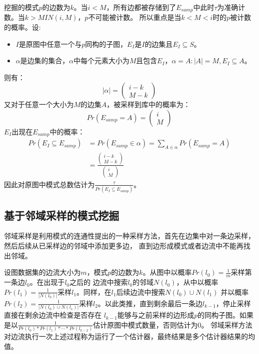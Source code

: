 \documentclass[master]{thesis-uestc}
\begin{document}
    挖掘的模式$p$的边数为$k$。当$i<M$，所有边都被存储到了$E_{samp}$中此时$\tau$为准确计数。当$k>MIN(i,M)$，$p$不可能被计数。
所以重点是当$k<M<i$时的$p$被计数的概率。设:
\begin{itemize}
    \item $I$是原图中任意一个与$p$同构的子图，$E_I$是$I$的边集且$E_I \subseteq S$。
    \item $\alpha$是边集的集合，$\alpha$中每个元素大小为$M$且包含$E_I$，$\alpha={A: |A| = M , E_I \subseteq A}$。
\end{itemize}
则有：
\begin{equation*}
    |\alpha|=\left(\begin{array}{c}
        i-k\\
        M-k
    \end{array}\right)
\end{equation*}
又对于任意一个大小为$M$的边集$A$，被采样到库中的概率为：
\begin{equation*}
    Pr(E_{samp}=A)=\left(\begin{array}{c}
        i\\
        M
    \end{array}\right)
\end{equation*}
$E_I$出现在$E_{samp}$中的概率：
\begin{equation*}
    \begin{aligned}
        Pr(E_I \subseteq E_{samp})&=Pr(E_{samp} \in \alpha)=\sum_{A\in\alpha}Pr(E_{samp}=A)\\
        &=\frac{\left(\begin{array}{c} i-k \\ M-k \end{array}\right)}{\left(\begin{array}{c} i \\ M \end{array}\right)}
    \end{aligned}
\end{equation*}
因此对原图中模式总数估计为$\frac{\tau}{Pr(E_I \subseteq E_{samp})}$。
 
\subsection{基于邻域采样的模式挖掘}
\label{subsec:neighbor}
    邻域采样是利用模式的连通性提出的一种采样方法，首先在边集中对一条边采样，然后后续从已采样边的邻域中添加更多边，
直到边形成模式或者边流中不能再找出邻域。

    设图数据集的边流大小为$m$，模式$p$的边数为$k$。从图中以概率$Pr(l_0)=\frac{1}{m}$采样第一条边$l_0$。在出现于$l_0$之后的
边流中搜索$l_0$的邻域$N(l_0)$，从中以概率$Pr(l_1)=\frac{1}{|N(l_0)|}$采样$l_1$。同样，在$l_1$后续边流中搜索$N(l_0) \cup N(l_1)$
并以概率$Pr(l_2)=\frac{1}{|N(l_0) \cup N(l_1)|}$采样$l_2$。以此类推，直到剩余最后一条边$l_{k-1}$，停止采样直接在剩余边流中检查是否存在
$l_{k-1}$能够与之前采样的边形成$p$的同构子图。如果是以$\frac{1}{Pr(l_0)*Pr(l_1)*\cdots*Pr(l_{k-2})}$估计原图中模式数量，否则估计为0。
邻域采样方法对边流执行一次上述过程称为运行了一个估计器，最终结果是多个估计器结果的均值。
\end{document}
